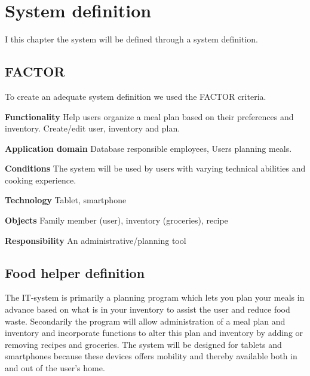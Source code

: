 \chapter{System definition}
I this chapter the system will be defined through a system definition.

\section{FACTOR}
To create an adequate system definition we used the FACTOR criteria. 

\textbf{Functionality}
Help users organize a meal plan based on their preferences and inventory. Create/edit user, inventory and plan. 

\textbf{Application domain}
Database responsible employees,
Users planning meals.

\textbf{Conditions}
The system will be used by users with varying technical abilities and cooking experience.

\textbf{Technology}
Tablet, smartphone

\textbf{Objects}
Family member (user), inventory (groceries), recipe

\textbf{Responsibility}
An administrative/planning tool


\section{Food helper definition}
The IT-system is primarily a planning program which lets you plan your meals in advance based on what is in your inventory to assist the user and reduce food waste. Secondarily the program will allow administration of a meal plan and inventory and incorporate functions to alter this plan and inventory by adding or removing recipes and groceries. The system will be designed for tablets and smartphones because these devices offers mobility and thereby available both in and out of the user’s home.
